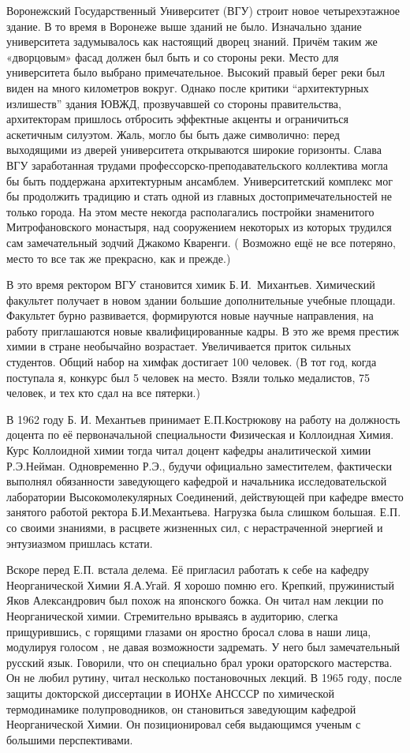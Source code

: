 Воронежский Государственный Университет (ВГУ)
\linebreak
строит новое четырехэтажное здание.
В то время в Воронеже выше зданий не было. Изначально здание университета задумывалось как настоящий дворец знаний. Причём таким же «дворцовым» фасад должен был быть и со стороны реки. Место для университета было выбрано примечательное. Высокий правый берег реки был виден на много километров вокруг. Однако после критики “архитектурных излишеств” здания ЮВЖД, прозвучавшей со стороны правительства, архитекторам пришлось отбросить эффектные акценты и ограничиться аскетичным силуэтом. Жаль, могло бы быть даже символично: перед выходящими из дверей университета открываются широкие горизонты. Слава ВГУ заработанная трудами профессорско-преподавательского коллектива могла бы быть поддержана архитектурным ансамблем. Университетский комплекс мог бы продолжить традицию и стать одной из главных достопримечательностей не только города. На этом месте некогда располагались постройки знаменитого Митрофановского монастыря, над сооружением некоторых из которых трудился сам замечательный зодчий Джакомо Кваренги. ( Возможно ещё не все потеряно, место то все так же прекрасно, как и прежде.)

В это время ректором ВГУ становится химик Б.\,И.~Михантьев.
Химический факультет получает в новом здании большие дополнительные учебные площади. Факультет бурно развивается, формируются новые научные направления, на работу приглашаются новые квалифицированные кадры. В это же время престиж химии в стране необычайно возрастает. Увеличивается приток сильных студентов. Общий набор на химфак достигает 100 человек. (В тот год, когда поступала я, конкурс был 5 человек на место. Взяли только медалистов, 75 человек, и тех кто сдал на все пятерки.)

В 1962 году Б. И. Механтьев принимает Е.П.Кострюкову на работу на должность доцента по её первоначальной специальности Физическая и Коллоидная Химия. Курс Коллоидной химии тогда читал доцент кафедры аналитической химии Р.Э.Нейман. Одновременно Р.Э., будучи официально заместителем, фактически выполнял обязанности заведующего кафедрой и начальника исследовательской лаборатории Высокомолекулярных Соединений, действующей при кафедре вместо занятого работой ректора Б.И.Механтьева. Нагрузка была слишком большая. Е.П. со своими знаниями, в расцвете жизненных сил, с нерастраченной энергией и энтузиазмом пришлась кстати.

Вскоре перед Е.П. встала делема. Её пригласил работать к себе на кафедру Неорганической Химии Я.А.Угай. Я хорошо помню его. Крепкий, пружинистый Яков Александрович был похож на японского божка. Он читал нам лекции по Неорганической химии. Стремительно врываясь в аудиторию, слегка прищурившись, с горящими глазами он яростно бросал слова в наши лица, модулируя голосом , не давая возможности задремать. У него был замечательный русский язык. Говорили, что он специально брал уроки ораторского мастерства. Он не любил рутину, читал несколько постановочных лекций. В 1965 году, после защиты докторской диссертации в ИОНХе АНСССР по химической термодинамике полупроводников, он становиться заведующим кафедрой Неорганической Химии. Он позиционировал себя выдающимся ученым с большими перспективами.

